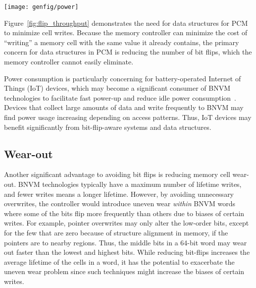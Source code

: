 \begin{SCfigure}
	\centering
	\texttt{[image: genfig/power]}
	\caption{Power use as a function of flips per second~\cite{bittman:nvmsa18}.}
	\label{fig:flip_throughput}
\end{SCfigure}

Figure~\ref{fig:flip_throughput} demonstrates the need for data structures for
PCM to minimize cell writes.  Because the memory controller can minimize the
cost of ``writing'' a memory cell with the same value it already contains, the
primary concern for data structures in PCM is reducing the number of bit flips,
which the memory controller cannot easily eliminate.

Power consumption is particularly concerning for battery-operated Internet of Things (IoT) devices,
which may become a significant consumer of BNVM technologies to facilitate fast power-up and reduce
idle power consumption~\cite{Jayakumar2014powering,jayakumar2014quickrecall}. Devices that collect
large amounts of data and write frequently to BNVM may find power usage
increasing depending on access patterns. Thus, IoT devices may benefit significantly
from bit-flip-aware systems and data structures.


\subsection{Wear-out}

Another significant advantage to avoiding bit flips is reducing memory cell
wear-out. BNVM technologies typically have a maximum number of lifetime writes,
and fewer writes means a longer lifetime. However, by avoiding unnecessary overwrites,
the controller would introduce uneven wear \emph{within} BNVM words where some of the bits flip
more frequently than others due to biases of certain writes.
For example, pointer overwrites may only alter the low-order bits, except
for the few that are zero because of structure alignment in memory, if the
pointers are to nearby regions. Thus, the middle bits in a 64-bit word may
wear out faster than the lowest and highest bits. While reducing bit-flips increases the
average lifetime of the cells in a word, it has the potential to exacerbate the uneven wear
problem since such techniques might increase the biases of certain writes.

